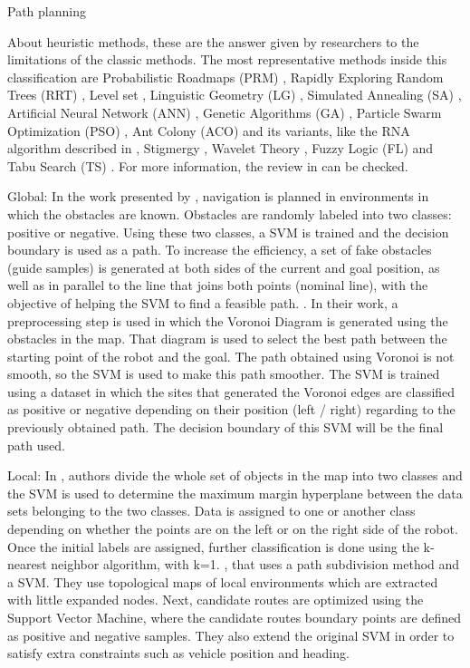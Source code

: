 \begin{frame}{Path planning}
{      About heuristic methods, these are the answer given by researchers to the limitations of the classic methods. The most representative methods inside this classification are Probabilistic Roadmaps (PRM) \citep{kavraki1996probabilistic}, Rapidly Exploring Random Trees (RRT) \citep{lavalle2000rapidly}, Level set \citep{sethian1999level}, Linguistic Geometry (LG) \citep{stilman1993network}, Simulated Annealing (SA) \citep{zhu2006robot}, Artificial Neural Network (ANN) \citep{hossain2012real}, Genetic Algorithms (GA) \citep{zhang2007evolutionary}, Particle Swarm Optimization (PSO) \citep{chen2006smooth}, Ant Colony (ACO) \citep{mou2008modified} and its variants, like the RNA algorithm described in \cite{zhu2011new}, Stigmergy \citep{cazangi2006evolutionary}, Wavelet Theory \citep{doh2005systematic}, Fuzzy Logic (FL) \citep{kladis2011energy} and Tabu Search (TS) \citep{nguyen2012multi}. For more information, the review in \cite{masehian2007classic} can be checked.
      
      Global:
      In the work presented by \cite{miura2006support}, navigation is planned in environments in which the obstacles are known. Obstacles are randomly labeled into two classes: positive or negative. Using these two classes, a \ac{SVM} is trained and the decision boundary is used as a path. To increase the efficiency, a set of fake obstacles (guide samples) is generated at both sides of the current and goal position, as well as in parallel to the line that joins both points (nominal line), with the objective of helping the \ac{SVM} to find a feasible path.
      \cite{yang2012safe}. In their work, a preprocessing step is used in which the Voronoi Diagram is generated using the obstacles in the map. That diagram is used to select the best path between the starting point of the robot and the goal. The path obtained using Voronoi is not smooth, so the \ac{SVM} is used to make this path smoother. The \ac{SVM} is trained using a dataset in which the sites that generated the Voronoi edges are classified as positive or negative depending on their position (left / right) regarding to the previously obtained path. The decision boundary of this \ac{SVM} will be the final path used.
      
      Local:
      In \cite{sarkar2008mobile, tennety2009support}, authors divide the whole set of objects in the map into two classes and the \ac{SVM} is used to determine the maximum margin hyperplane between the data sets belonging to the two classes. Data is assigned to one or another class depending on whether the points are on the left or on the right side of the robot. Once the initial labels are assigned, further classification is done using the k-nearest neighbor algorithm, with k=1.
      \cite{qingyang2012local}, that uses a path subdivision method and a \ac{SVM}. They use topological maps of local environments which are extracted with little expanded nodes. Next, candidate routes are optimized using the Support Vector Machine, where the candidate routes boundary points are defined as positive and negative samples. They also extend the original \ac{SVM} \citep{cortes1995support} in order to satisfy extra constraints such as vehicle position and heading.
    }
  \end{frame}
  
